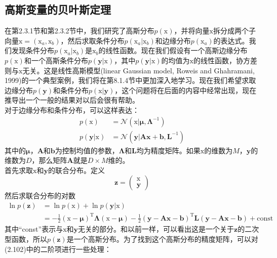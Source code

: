 \documentclass[b5paper]{book}
\numberwithin{equation}{chapter}
\newcommand {\bx} {\boldsymbol{\mathrm{x}}}
\newcommand {\rmT} {\mathrm{T}}
\newcommand {\bfMu} {\boldsymbol{\mu}}
\newcommand {\bfLambda} {\boldsymbol{\Lambda}}
\begin{document}
	\subsection{高斯变量的贝叶斯定理}
	\textnormal{
	在第2.3.1节和第2.3.2节中，我们研究了高斯分布$p(\bx)$，并将向量$\bx$拆分成两个子向量$\bx=(\bx_a,\bx_b)$，然后求取条件分布$p(\bx_a|\bx_b)$和边缘分布$p(\bx_a)$的表达式。我们发现条件分布$p(\bx_a|\bx_b)$是$\bx_b$的线性函数。现在我们假设有一个高斯边缘分布$p(\bx)$和一个高斯条件分布$p(\mathbf{y}|\bx)$，其中$p(\mathbf{y}|\bx)$的均值为$\bx$的线性函数，协方差则与$\bx$无关。这是线性高斯模型(linear Gaussian model, Roweis and Ghahramani, 1999)的一个典型案例，我们将在第8.1.4节中更加深入地学习。现在我们希望求取边缘分布$p(\mathbf{y})$和条件分布$p(\bx|\mathbf{y})$，这个问题将在后面的内容中经常出现，现在推导出一个一般的结果对以后会很有帮助。\\
	\indent 对于边缘分布和条件分布，可以这样表达：
	\begin{align}
		p(\bx)&=\mathcal{N}(\bx|\bfMu,\bfLambda^{-1}) \\
		p(\mathbf{y}|\bx)&=\mathcal{N}(\mathbf{y}|\mathbf{Ax+b},\mathbf{L}^{-1})
	\end{align}
	其中的$\bfMu$，$\mathbf{A}$和$\mathbf{b}$为控制均值的参数，$\bfLambda$和$\mathbf{L}$均为精度矩阵。如果$\bx$的维数为$M$，$\mathbf{y}$的维数为$D$，那么矩阵$\mathbf{A}$就是$D \times M$维的。\\
	\indent 首先求取$\bx$和$\mathbf{y}$的联合分布。定义
	\begin{equation}
		\mathbf{z}=\left(\begin{matrix}
			\bx \\ \mathbf{y}
		\end{matrix}\right)
	\end{equation}
	然后求联合分布的对数
	\begin{equation}
	\begin{split}
		\ln p(\mathbf{z}) &= \ln p(\bx) + \ln p(\mathbf{y}|\bx) \\
		&=-\frac{1}{2}(\bx-\bfMu)^{\rmT}\bfLambda(\bx-\bfMu) -\frac{1}{2}(\mathbf{y}-\mathbf{Ax}-\mathbf{b})^{\rmT}\mathbf{L}(\mathbf{y}-\mathbf{Ax}-\mathbf{b})+\mathrm{const}
	\end{split}
	\end{equation}
	其中“const”表示与$\bx$和$\mathbf{y}$无关的部分。和以前一样，可以看出这是一个关于$\mathbf{z}$的二次型函数，所以$p(\mathbf{z})$是一个高斯分布。为了找到这个高斯分布的精度矩阵，可以对(2.102)中的二阶项进行一些处理：
	\begin{equation}
	\begin{split}

\end{split}
\end{equation}}
\end{document}
